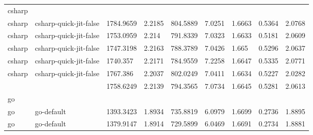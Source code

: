 \begin{longtable}[h]{|lllllllll|}
csharp         &                        &                           &                                                                      &                       &                  &                  &              &               \\
csharp         & csharp-quick-jit-false & 1784.9659                 & 2.2185                                                               & 804.5889              & 7.0251           & 1.6663           & 0.5364       & 2.0768        \\
csharp         & csharp-quick-jit-false & 1753.0959                 & 2.214                                                                & 791.8339              & 7.0323           & 1.6633           & 0.5181       & 2.0609        \\
csharp         & csharp-quick-jit-false & 1747.3198                 & 2.2163                                                               & 788.3789              & 7.0426           & 1.665            & 0.5296       & 2.0637        \\
csharp         & csharp-quick-jit-false & 1740.357                  & 2.2171                                                               & 784.9559              & 7.2258           & 1.6647           & 0.5335       & 2.0771        \\
csharp         & csharp-quick-jit-false & 1767.386                  & 2.2037                                                               & 802.0249              & 7.0411           & 1.6634           & 0.5227       & 2.0282        \\
               &                        & 1758.6249                 & 2.2139                                                               & 794.3565              & 7.0734           & 1.6645           & 0.5281       & 2.0613        \\
go             &                        &                           &                                                                      &                       &                  &                  &              &               \\
go             & go-default             & 1393.3423                 & 1.8934                                                               & 735.8819              & 6.0979           & 1.6699           & 0.2736       & 1.8895        \\
go             & go-default             & 1379.9147                 & 1.8914                                                               & 729.5899              & 6.0469           & 1.6691           & 0.2734       & 1.8881        \\

\end{longtable}
